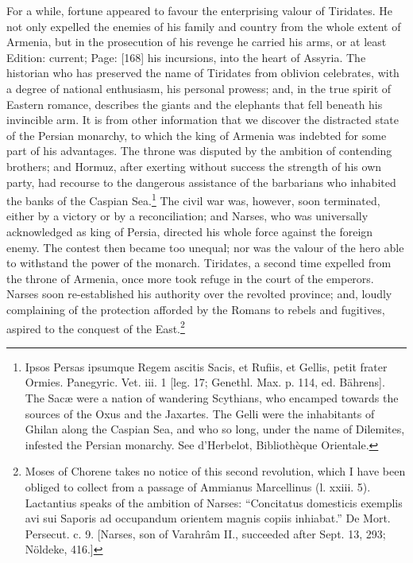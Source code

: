 For a while, fortune appeared to favour the enterprising valour of Tiridates. He not only expelled the enemies of his family and country from the whole extent of Armenia, but in the prosecution of his revenge he carried his arms, or at least Edition: current; Page: [168] his incursions, into the heart of Assyria. The historian who has preserved the name of Tiridates from oblivion celebrates, with a degree of national enthusiasm, his personal prowess; and, in the true spirit of Eastern romance, describes the giants and the elephants that fell beneath his invincible arm. It is from other information that we discover the distracted state of the Persian monarchy, to which the king of Armenia was indebted for some part of his advantages. The throne was disputed by the ambition of contending brothers; and Hormuz, after exerting without success the strength of his own party, had recourse to the dangerous assistance of the barbarians who inhabited the banks of the Caspian Sea.\footnote{Ipsos Persas ipsumque Regem ascitis Sacis, et Rufiis, et Gellis, petit frater Ormies. Panegyric. Vet. iii. 1 [leg. 17; Genethl. Max. p. 114, ed. Bährens]. The Sacæ were a nation of wandering Scythians, who encamped towards the sources of the Oxus and the Jaxartes. The Gelli were the inhabitants of Ghilan along the Caspian Sea, and who so long, under the name of Dilemites, infested the Persian monarchy. See d\texthebrew{}’Herbelot, Bibliothèque Orientale.} The civil war was, however, soon terminated, either by a victory or by a reconciliation; and Narses, who was universally acknowledged as king of Persia, directed his whole force against the foreign enemy. The contest then became too unequal; nor was the valour of the hero able to withstand the power of the monarch. Tiridates, a second time expelled from the throne of Armenia, once more took refuge in the court of the emperors. Narses soon re-established his authority over the revolted province; and, loudly complaining of the protection afforded by the Romans to rebels and fugitives, aspired to the conquest of the East.\footnote{Moses of Chorene takes no notice of this second revolution, which I have been obliged to collect from a passage of Ammianus Marcellinus (l. xxiii. 5). Lactantius speaks of the ambition of Narses: \texthebrew{“}Concitatus domesticis exemplis avi sui Saporis ad occupandum orientem magnis copiis inhiabat.\texthebrew{}” De Mort. Persecut. c. 9. [Narses, son of Varahrâm II., succeeded after Sept. 13, 293; Nöldeke, 416.]}

